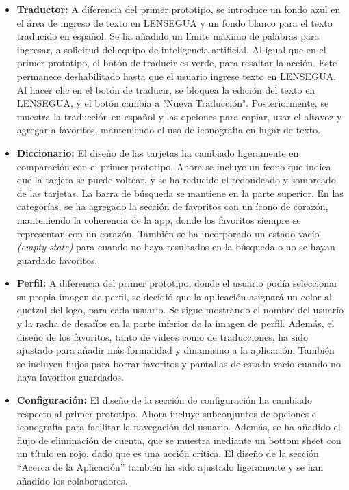 \begin{itemize}
    \item \textbf{Traductor:} A diferencia del primer prototipo, se introduce un fondo azul en el área de ingreso de texto en LENSEGUA y un fondo blanco para el texto traducido en español. Se ha añadido un límite máximo de palabras para ingresar, a solicitud del equipo de inteligencia artificial. Al igual que en el primer prototipo, el botón de traducir es verde, para resaltar la acción. Este permanece deshabilitado hasta que el usuario ingrese texto en LENSEGUA. Al hacer clic en el botón de traducir, se bloquea la edición del texto en LENSEGUA, y el botón cambia a "Nueva Traducción". Posteriormente, se muestra la traducción en español y las opciones para copiar, usar el altavoz y agregar a favoritos, manteniendo el uso de iconografía en lugar de texto.

    \item \textbf{Diccionario:} El diseño de las tarjetas ha cambiado ligeramente en comparación con el primer prototipo. Ahora se incluye un ícono que indica que la tarjeta se puede voltear, y se ha reducido el redondeado y sombreado de las tarjetas. La barra de búsqueda se mantiene en la parte superior. En las categorías, se ha agregado la sección de favoritos con un ícono de corazón, manteniendo la coherencia de la app, donde los favoritos siempre se representan con un corazón. También se ha incorporado un estado vacío \textit{(empty state)} para cuando no haya resultados en la búsqueda o no se hayan guardado favoritos.

    \item \textbf{Perfil:} A diferencia del primer prototipo, donde el usuario podía seleccionar su propia imagen de perfil, se decidió que la aplicación asignará un color al quetzal del logo, para cada usuario. Se sigue mostrando el nombre del usuario y la racha de desafíos en la parte inferior de la imagen de perfil. Además, el diseño de los favoritos, tanto de videos como de traducciones, ha sido ajustado para añadir más formalidad y dinamismo a la aplicación. También se incluyen flujos para borrar favoritos y pantallas de estado vacío cuando no haya favoritos guardados.

    \item \textbf{Configuración:} El diseño de la sección de configuración ha cambiado respecto al primer prototipo. Ahora incluye subconjuntos de opciones e iconografía para facilitar la navegación del usuario. Además, se ha añadido el flujo de eliminación de cuenta, que se muestra mediante un bottom sheet con un título en rojo, dado que es una acción crítica. El diseño de la sección ``Acerca de la Aplicación'' también ha sido ajustado ligeramente y se han añadido los colaboradores.


\end{itemize}
